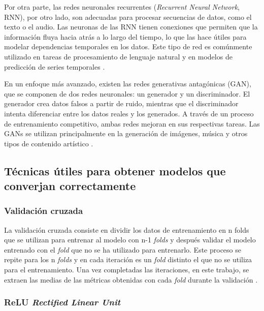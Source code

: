 Por otra parte, las redes neuronales recurrentes (\textit{Recurrent Neural Network}, RNN), por otro lado, son adecuadas para procesar secuencias de datos, como el texto o el audio. Las neuronas de las RNN tienen conexiones que permiten que la información fluya hacia atrás a lo largo del tiempo, lo que las hace útiles para modelar dependencias temporales en los datos. Este tipo de red es comúnmente utilizado en tareas de procesamiento de lenguaje natural y en modelos de predicción de series temporales \cite{haykin2009neural}.

En un enfoque más avanzado, existen las redes generativas antagónicas (GAN), que se componen de dos redes neuronales: un generador y un discriminador. El generador crea datos falsos a partir de ruido, mientras que el discriminador intenta diferenciar entre los datos reales y los generados. A través de un proceso de entrenamiento competitivo, ambas redes mejoran en sus respectivas tareas. Las GANs se utilizan principalmente en la generación de imágenes, música y otros tipos de contenido artístico \cite{nielsen2015neural}.



\subsection{Técnicas útiles para obtener modelos que converjan correctamente}

\subsubsection{Validación cruzada}
La validación cruzada consiste en dividir los datos de entrenamiento en n folds que se utilizan para entrenar al modelo con n-1 \textit{folds} y después validar el modelo entrenado con el \textit{fold} que no se ha utilizado para entrenarlo. Este proceso se repite para los n \textit{folds} y en cada iteración es un \textit{fold} distinto el que no se utiliza para el entrenamiento. Una vez completadas las iteraciones, en este trabajo, se extraen las medias de las métricas obtenidas con cada \textit{fold} durante la validación \cite{hastie2009elements}.

\subsubsection{ReLU \textit{Rectified Linear Unit}}

